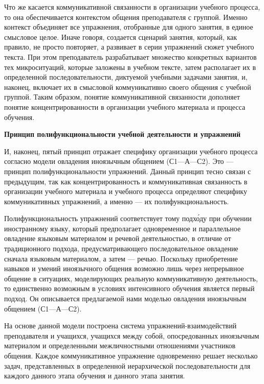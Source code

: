 Что же касается коммуникативной связанности в организации учебного процесса, то она обеспечивается контекстом общения преподавателя с группой. Именно контекст объединяет все упражнения, отобранные для одного занятия, в единое смысловое целое. Иначе говоря, создается сценарий занятия, который, как правило, не просто повторяет, а развивает в серии упражнений сюжет учебного текста. При этом преподаватель разрабатывает множество конкретных вариантов тех микроситуаций, которые заложены в учебном тексте, затем располагает их в определенной последовательности, диктуемой учебными задачами занятия, и, наконец, включает их в смысловой коммуникативно  своего общения с учебной группой. Таким образом, понятие коммуникативной связанности дополняет понятие концентрированности в организации учебного материала и процесса обучения.

\textbf{Принцип полифункциональности учебной деятельности и упражнений}

И, наконец, пятый принцип отражает специфику организации учебного процесса согласно модели овладения иноязычным общением (С1—А—С2). Это --- принцип полифункциональности упражнений. Данный принцип тесно связан с предыдущим, так как концентрированность и коммуникативная связанность в организации учебного материала и учебного процесса определяют специфику коммуникативных упражнений, а именно — их полифункциональность.

Полифункциональность упражнений соответствует тому подх\'{о}ду при обучении иностранному языку, который предполагает одновременное и параллельное овладение языковым материалом и речевой деятельностью, в отличие от традиционного подхода, предусматривающего последовательное овладение сначала языковым материалом, а затем --- речью. Поскольку приобретение навыков и умений иноязычного общения возможно лишь через непрерывное общение в ситуациях, моделирующих реальную коммуникативную деятельность, то единственно возможным в условиях интенсивного обучения является первый подход. Он описывается предлагаемой нами моделью овладения иноязычным общением (С1—А—С2).

На основе данной модели построена система упражнений-взаимодействий преподавателя и учащихся, учащихся между собой, опосредованных иноязычным материалом и определенными межличностными отношениями участников общения. Каждое коммуникативное упражнение одновременно решает несколько задач, представленных в определенной иерархической последовательности для каждого данного этапа обучения и данного этапа занятия.

